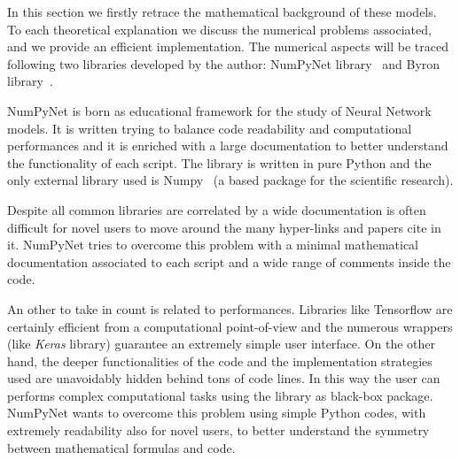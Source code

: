 \documentclass{standalone}
\begin{document}
In this section we firstly retrace the mathematical background of these models.
To each theoretical explanation we discuss the numerical problems associated, and we provide an efficient implementation.
The numerical aspects will be traced following two libraries developed by the author: \textsf{NumPyNet} library~\cite{NumPyNet} and \textsf{Byron} library~\cite{Byron}.

\textsf{NumPyNet} is born as educational framework for the study of Neural Network models.
It is written trying to balance code readability and computational performances and it is enriched with a large documentation to better understand the functionality of each script.
The library is written in pure \textsf{Python} and the only external library used is \textsf{Numpy}~\cite{Numpy} (a based package for the scientific research).

Despite all common libraries are correlated by a wide documentation is often difficult for novel users to move around the many hyper-links and papers cite in it.
\textsf{NumPyNet} tries to overcome this problem with a minimal mathematical documentation associated to each script and a wide range of comments inside the code.

An other  to take in count is related to performances.
Libraries like \textsf{Tensorflow} are certainly efficient from a computational point-of-view and the numerous wrappers (like \emph{Keras} library) guarantee an extremely simple user interface.
On the other hand, the deeper functionalities of the code and the implementation strategies used are unavoidably hidden behind tons of code lines.
In this way the user can performs complex computational tasks using the library as black-box package.
\textsf{NumPyNet} wants to overcome this problem using simple \textsf{Python} codes, with extremely readability also for novel users, to better understand the symmetry between mathematical formulas and code.
\end{document}
